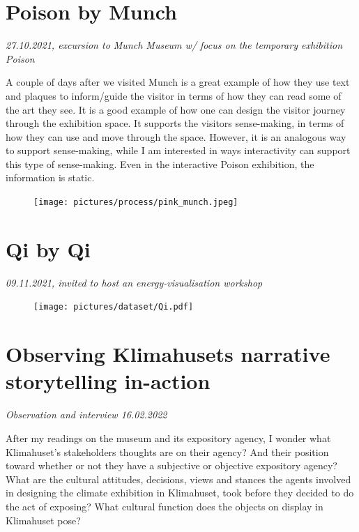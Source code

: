\section{Poison by Munch}
\par
\emph{27.10.2021, excursion to Munch Museum w/ focus on the temporary exhibition Poison}
\par

A couple of days after we visited 
Munch is a great example of how they use text and plaques to inform/guide the visitor in terms of how they can read some of the art they see. It is a good example of how one can design the visitor journey through the exhibition space. It supports the visitors sense-making, in terms of how they can use and move through the space. However, it is an analogous way to support sense-making, while I am interested in ways interactivity can support this type of sense-making. Even in the interactive Poison exhibition, the information is static.

\begin{figure}[H]
\texttt{[image: pictures/process/pink\_munch.jpeg]}
\centering 
\end{figure}

\section{Qi by Qi}
\emph{09.11.2021, invited to host an energy-visualisation workshop}
\begin{figure}[H]
\texttt{[image: pictures/dataset/Qi.pdf]}
\centering 
\end{figure}


\section{Observing Klimahusets narrative storytelling in-action}
\par
\emph{Observation and interview 16.02.2022}
\par

After my readings on the museum and its expository agency, I wonder what Klimahuset’s stakeholders thoughts are on their agency? And their position toward whether or not they have a subjective or objective expository agency? What are the cultural attitudes, decisions, views and stances the agents involved in designing the climate exhibition in Klimahuset, took before they decided to do the act of exposing? What cultural function does the objects on display in Klimahuset pose? 

